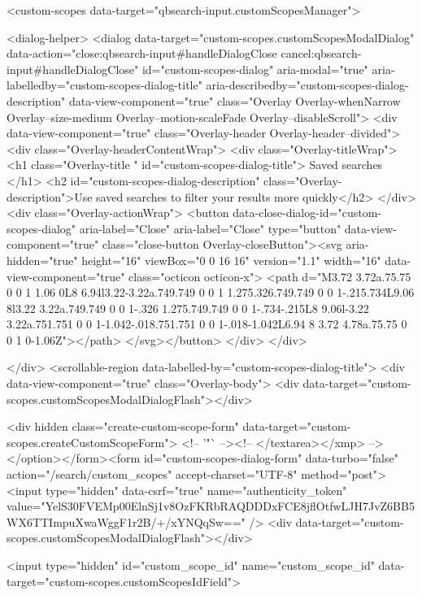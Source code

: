     <custom-scopes data-target="qbsearch-input.customScopesManager">
    
<dialog-helper>
  <dialog data-target="custom-scopes.customScopesModalDialog" data-action="close:qbsearch-input#handleDialogClose cancel:qbsearch-input#handleDialogClose" id="custom-scopes-dialog" aria-modal="true" aria-labelledby="custom-scopes-dialog-title" aria-describedby="custom-scopes-dialog-description" data-view-component="true" class="Overlay Overlay-whenNarrow Overlay--size-medium Overlay--motion-scaleFade Overlay--disableScroll">
    <div data-view-component="true" class="Overlay-header Overlay-header--divided">
  <div class="Overlay-headerContentWrap">
    <div class="Overlay-titleWrap">
      <h1 class="Overlay-title " id="custom-scopes-dialog-title">
        Saved searches
      </h1>
        <h2 id="custom-scopes-dialog-description" class="Overlay-description">Use saved searches to filter your results more quickly</h2>
    </div>
    <div class="Overlay-actionWrap">
      <button data-close-dialog-id="custom-scopes-dialog" aria-label="Close" aria-label="Close" type="button" data-view-component="true" class="close-button Overlay-closeButton"><svg aria-hidden="true" height="16" viewBox="0 0 16 16" version="1.1" width="16" data-view-component="true" class="octicon octicon-x">
    <path d="M3.72 3.72a.75.75 0 0 1 1.06 0L8 6.94l3.22-3.22a.749.749 0 0 1 1.275.326.749.749 0 0 1-.215.734L9.06 8l3.22 3.22a.749.749 0 0 1-.326 1.275.749.749 0 0 1-.734-.215L8 9.06l-3.22 3.22a.751.751 0 0 1-1.042-.018.751.751 0 0 1-.018-1.042L6.94 8 3.72 4.78a.75.75 0 0 1 0-1.06Z"></path>
</svg></button>
    </div>
  </div>
  
</div>
      <scrollable-region data-labelled-by="custom-scopes-dialog-title">
        <div data-view-component="true" class="Overlay-body">        <div data-target="custom-scopes.customScopesModalDialogFlash"></div>

        <div hidden class="create-custom-scope-form" data-target="custom-scopes.createCustomScopeForm">
        <!-- '"` --><!-- </textarea></xmp> --></option></form><form id="custom-scopes-dialog-form" data-turbo="false" action="/search/custom_scopes" accept-charset="UTF-8" method="post"><input type="hidden" data-csrf="true" name="authenticity_token" value="YelS30FVEMp00ElnSj1v8OzFKRbRAQDDDxFCE8jflOtfwLJH7JvZ6BB5WX6TTImpuXwaWggF1r2B/+/xYNQqSw==" />
          <div data-target="custom-scopes.customScopesModalDialogFlash"></div>

          <input type="hidden" id="custom_scope_id" name="custom_scope_id" data-target="custom-scopes.customScopesIdField">

